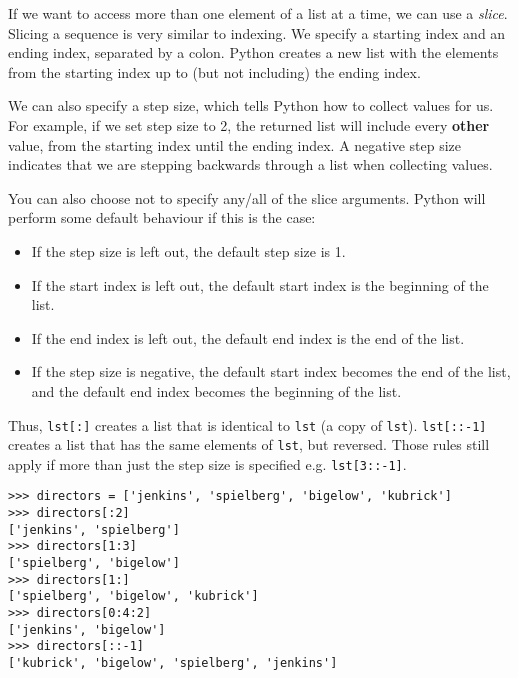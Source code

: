 If we want to access more than one element of a list at a time, we can use a
\textit{slice}. Slicing a sequence is very similar to indexing. We specify a
starting index and an ending index, separated by a colon. Python creates a new
list with the elements from the starting index up to (but not including) the
ending index.

We can also specify a step size, which tells Python how to collect values for
us. For example, if we set step size to 2, the returned list will include every
\textbf{other} value, from the starting index until the ending index. A negative
step size indicates that we are stepping backwards through a list when collecting
values.

You can also choose not to specify any/all of the slice arguments. Python will
perform some default behaviour if this is the case:
\begin{itemize}
    \item If the step size is left out, the default step size is 1.
    \item If the start index is left out, the default start index is the beginning of the list.
    \item If the end index is left out, the default end index is the end of the list.
    \item If the step size is negative, the default start index becomes the end
        of the list, and the default end index becomes the beginning of the
        list.
\end{itemize}

Thus, \texttt{lst[:]} creates a list that is identical to \texttt{lst} (a copy
of \texttt{lst}). \texttt{lst[::-1]} creates a list that has the same elements
of \texttt{lst}, but reversed. Those rules still apply if more than just the
step size is specified e.g. \texttt{lst[3::-1]}.

\begin{lstlisting}
>>> directors = ['jenkins', 'spielberg', 'bigelow', 'kubrick']
>>> directors[:2]
['jenkins', 'spielberg']
>>> directors[1:3]
['spielberg', 'bigelow']
>>> directors[1:]
['spielberg', 'bigelow', 'kubrick']
>>> directors[0:4:2]
['jenkins', 'bigelow']
>>> directors[::-1]
['kubrick', 'bigelow', 'spielberg', 'jenkins']
\end{lstlisting}
